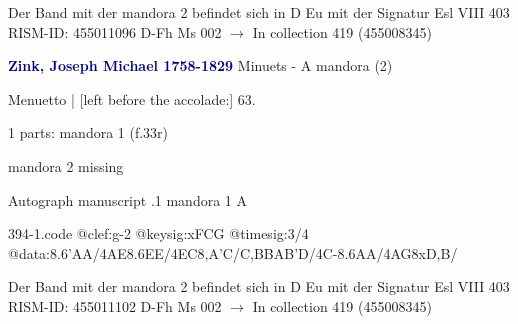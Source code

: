 \documentclass[twocolumn]{book}
\begin{document}
\newline Der Band mit der mandora 2 befindet sich in D Eu mit der Signatur Esl VIII 403
\newline RISM-ID: 455011096
\newline D-Fh  Ms 002
\newline $\rightarrow$ In collection 419 (455008345)
      
\newline \par \vspace{7pt} \textcolor{darkblue}{\textbf{Zink, Joseph Michael  1758-1829}}
\newline Minuets - A
\newline mandora (2)
\newline \begin{itshape}[f.33r, at left:] Menuetto | [left before the accolade:] 63.\end{itshape} 
\newline \textcolor{darkblue}{}  1 parts: mandora 1  (f.33r)
\newline \begin{small} mandora 2 missing\end{small} 
\newline Autograph manuscript
.1  mandora 1  A  
\begin{filecontents*}{394-1.code}
@clef:g-2
@keysig:xFCG
@timesig:3/4
@data:{8.6'AA}/4AE{8.6EE}/4EC{8,A'C}/C,BBA{B'D}/4C-{8.6AA}/4AG{8xD,B}/
\end{filecontents*}
\newline
%

\newline Der Band mit der mandora 2 befindet sich in D Eu mit der Signatur Esl VIII 403
\newline RISM-ID: 455011102
\newline D-Fh  Ms 002
\newline $\rightarrow$ In collection 419 (455008345)
      
\end{document}
